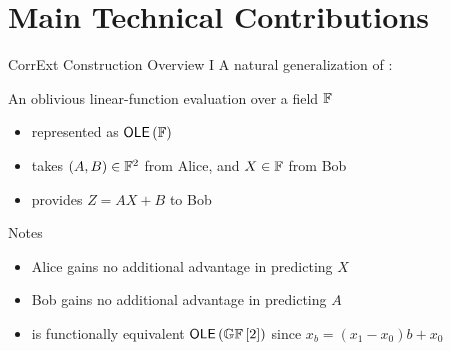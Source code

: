 \section{Main Technical Contributions}
\begin{frame}{CorrExt Construction Overview I}
%		
	A natural generalization of \OT:
	\begin{definition}
		An oblivious linear-function evaluation over a field $ {\mathbb F} $
		\begin{itemize}
			\item represented as $ \OLE[\bbF] $
			\item takes $ (A,B) \in {\mathbb F}^2 $ from Alice, and $ X \in {\mathbb F} $ from Bob
			\item provides $ Z = AX +B $ to Bob 
		\end{itemize}  
	\end{definition}
	\pause
	{
	\begin{block}{Notes}
	\begin{itemize}
		\item Alice gains no additional advantage in predicting $ X $
		\item Bob gains no additional advantage in predicting  $ A $
		\item  \OT is functionally equivalent $ \OLE[\GF{2}] $ since $ x_b = (x_1 - x_0)b + x_0 $
	\end{itemize}
	\end{block}}
	
\end{frame}

